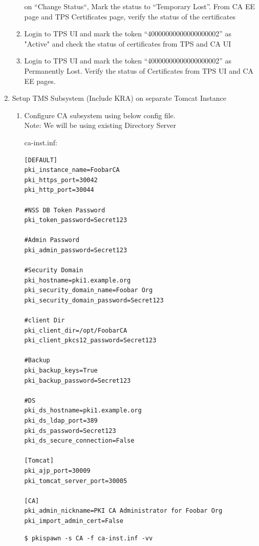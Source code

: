 \documentclass[12pt]{report}
\begin{document}
\begin{enumerate}[label*=\arabic*.]
\begin{enumerate}[label*=\arabic*.]
                        on ``Change Status``, Mark the status to ``Temporary Lost''. From CA EE page and TPS Certificates
                        page, verify the status of the certificates
                    \item \label{token_ex13} Login to TPS UI and mark the token ``40000000000000000002'' as "Active" and check the status
                        of certificates from TPS and CA UI 
                    \item \label{token_ex14} Login to TPS UI and mark the token ``40000000000000000002'' as  Permanently Lost.  Verify the
                        status of Certificates from TPS UI and CA EE pages.
        \end{enumerate}
    \item Setup TMS Subsystem (Include KRA) on separate Tomcat Instance
        \begin{enumerate}[label*=\arabic*.]
            \item Configure CA subsystem using below config file.\\
                Note: We will be using existing Directory Server

                ca-inst.inf:
                \begin{lstlisting}[style=configFile]
[DEFAULT]
pki_instance_name=FoobarCA
pki_https_port=30042
pki_http_port=30044

#NSS DB Token Password
pki_token_password=Secret123

#Admin Password
pki_admin_password=Secret123

#Security Domain
pki_hostname=pki1.example.org
pki_security_domain_name=Foobar Org
pki_security_domain_password=Secret123

#client Dir
pki_client_dir=/opt/FoobarCA
pki_client_pkcs12_password=Secret123

#Backup
pki_backup_keys=True
pki_backup_password=Secret123

#DS
pki_ds_hostname=pki1.example.org
pki_ds_ldap_port=389
pki_ds_password=Secret123
pki_ds_secure_connection=False

[Tomcat]
pki_ajp_port=30009
pki_tomcat_server_port=30005

[CA]
pki_admin_nickname=PKI CA Administrator for Foobar Org
pki_import_admin_cert=False
                \end{lstlisting}
                \begin{lstlisting}
$ pkispawn -s CA -f ca-inst.inf -vv                
                \end{lstlisting}


\end{enumerate}
\end{enumerate}
\end{document}
